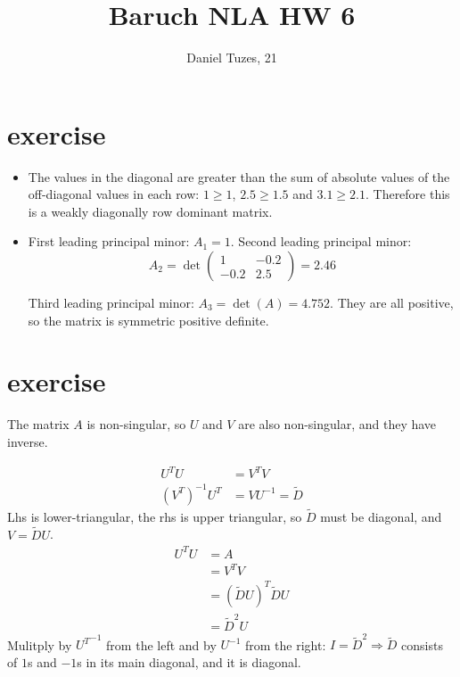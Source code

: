 \documentclass{article}
\title{Baruch NLA HW 6}
\author{Daniel Tuzes, 21}
\begin{document}
\maketitle
\section{exercise}
\begin{itemize}
    \item The values in the diagonal are greater than
          the sum of absolute values of the off-diagonal values in each row:
          $1 \ge 1$, $2.5 \ge 1.5$ and $3.1 \ge 2.1$.
          Therefore this is a weakly diagonally row dominant matrix.
    \item First leading principal minor:    \(A_{1} = 1\). Second leading principal minor:
          \[
              A_{2} = \det\left(\begin{matrix} 1 & -0.2 \\ -0.2 & 2.5 \end{matrix}\right) = 2.46
          \]

          Third leading principal minor: \(A_{3} = \det(A) = 4.752\).
          They are all positive, so the matrix is symmetric positive definite.
\end{itemize}

\section{exercise}
The matrix $A$ is non-singular, so $U$ and $V$ are also non-singular,
and they have inverse.

\begin{align*}
    {U^T}U                               & = {V^T}V                  \\
    {\left( {{V^T}} \right)^{ - 1}}{U^T} & = V{U^{ - 1}} = \tilde{D}
\end{align*}
Lhs is lower-triangular, the rhs is upper triangular,
so $\tilde{D}$ must be diagonal, and $V=\tilde{D}U$.
\begin{align*}
    {U^T}U & = A                                         \\
           & = {V^T}V                                    \\
           & = {\left( {\tilde{D}U} \right)^T}\tilde{D}U \\
           & = {\tilde{D}^2}U
\end{align*}
Mulitply by ${U^T}^{-1}$ from the left and by $U^{-1}$ from the right: $I=\tilde{D}^2 \Rightarrow \tilde{D}$ consists of $1$s and $-1$s in its main diagonal,
and it is diagonal.
\end{document}
